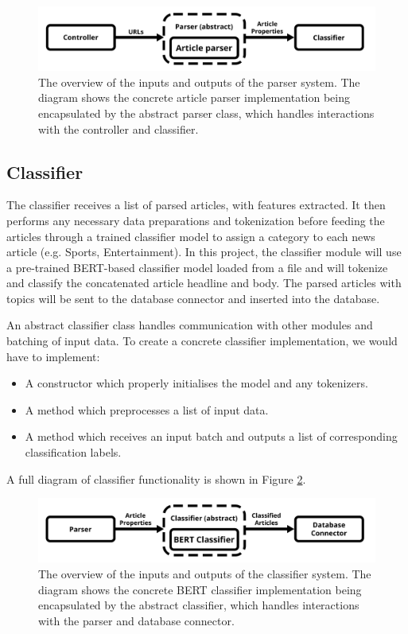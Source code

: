 \documentclass{l4proj}
\begin{document}
 \begin{figure}[h]
\centering
\includegraphics[width=\textwidth]{images/Parser-diagram.png}
\caption{The overview of the inputs and outputs of the parser system. The diagram shows the concrete article parser implementation being encapsulated by the abstract parser class, which handles interactions with the controller and classifier.}
\label{fig:parser_diagram}
\end{figure}

\subsection{Classifier}
The classifier receives a list of parsed articles, with features extracted. It then performs any necessary data preparations and tokenization before feeding the articles through a trained classifier model to assign a category to each news article (e.g. Sports, Entertainment). In this project, the classifier module will use a pre-trained BERT-based classifier model loaded from a file and will tokenize and classify the concatenated article headline and body. The parsed articles with topics will be sent to the database connector and inserted into the database. \par
An abstract classifier class handles communication with other modules and batching of input data. To create a concrete classifier implementation, we would have to implement:
\begin{itemize}
    \item A constructor which properly initialises the model and any tokenizers.
    \item A method which preprocesses a list of input data.
    \item A method which receives an input batch and outputs a list of corresponding classification labels.
\end{itemize}

A full diagram of classifier functionality is shown in Figure \ref{fig:classifier_diagram}.

 \begin{figure}[h]
\centering
\includegraphics[width=\textwidth]{images/Classifier-diagram.png}
\caption{The overview of the inputs and outputs of the classifier system. The diagram shows the concrete BERT classifier implementation being encapsulated by the abstract classifier, which handles interactions with the parser and database connector.}
\label{fig:classifier_diagram}
\end{figure}
\end{document}
